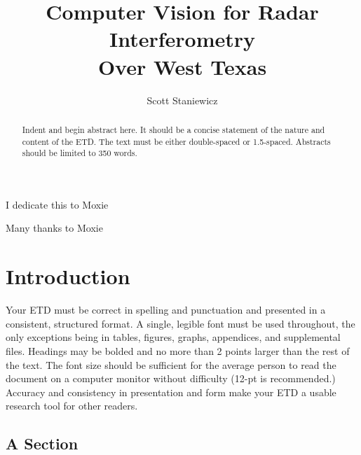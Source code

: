 \documentclass{utexasthesis}
\title{Computer Vision for Radar Interferometry \\ Over West Texas }
\author{Scott Staniewicz}
\begin{document}
\maketitle

\begin{dedication}
  I dedicate this to Moxie
\end{dedication}


\begin{acknowledgments}
  Many thanks to Moxie
\end{acknowledgments}

\begin{abstract}
  Indent and begin abstract here. It should be a concise statement of the nature and content of the ETD. The text must be either double-spaced or 1.5-spaced. Abstracts should be limited to 350 words.
\end{abstract}

\maketableofcontents


\chapter{Introduction}

Your ETD must be correct in spelling and punctuation and presented in a consistent, structured format. A single, legible font must be used throughout, the only exceptions being in tables, figures, graphs, appendices, and supplemental files. Headings may be bolded and no more than 2 points larger than the rest of the text. The font size should be sufficient for the average person to read the document on a computer monitor without difficulty (12-pt is recommended.) Accuracy and consistency in presentation and form make your ETD a usable research tool for other readers.


\section{A Section}
\end{document}

